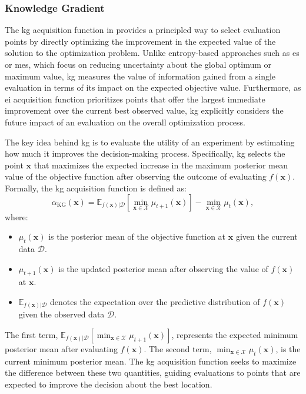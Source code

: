 \subsubsection{Knowledge Gradient}
\label{section:knowledge_gradient}

The \acf{kg} acquisition function in \citet{frazier2008knowledge, wu2016parallel} provides a principled way to select evaluation points by directly optimizing the improvement in the expected value of the solution to the optimization problem. Unlike entropy-based approaches such as \ac{es} or \ac{mes}, which focus on reducing uncertainty about the global optimum or maximum value, \ac{kg} measures the value of information gained from a single evaluation in terms of its impact on the expected objective value. Furthermore, as \acf{ei} acquisition function prioritizes points that offer the largest immediate improvement over the current best observed value, \ac{kg} explicitly considers the future impact of an evaluation on the overall optimization process. 

The key idea behind \ac{kg} is to evaluate the utility of an experiment by estimating how much it improves the decision-making process. Specifically, \ac{kg} selects the point $\mathbf{x}$ that maximizes the expected increase in the maximum posterior mean value of the objective function after observing the outcome of evaluating $f(\mathbf{x})$. Formally, the \ac{kg} acquisition function is defined as:
\begin{equation*}
    \alpha_{\text{KG}}(\mathbf{x}) = \mathbb{E}_{f(\mathbf{x}) \vert \mathcal{D}} \left[ \min_{\mathbf{x} \in \mathcal{X}} \mu_{t+1}(\mathbf{x}) \right] - \min_{\mathbf{x} \in \mathcal{X}} \mu_t(\mathbf{x}),
\end{equation*}
where:
\begin{itemize}
    \item $\mu_t(\mathbf{x})$ is the posterior mean of the objective function at $\mathbf{x}$ given the current data $\mathcal{D}$.
    \item $\mu_{t+1}(\mathbf{x})$ is the updated posterior mean after observing the value of $f(\mathbf{x})$ at $\mathbf{x}$.
    \item $\mathbb{E}_{f(\mathbf{x}) \vert \mathcal{D}}$ denotes the expectation over the predictive distribution of $f(\mathbf{x})$ given the observed data $\mathcal{D}$.
\end{itemize}

The first term, $\mathbb{E}_{f(\mathbf{x}) \vert \mathcal{D}} \left[ \min_{\mathbf{x} \in \mathcal{X}} \mu_{t+1}(\mathbf{x}) \right]$, represents the expected minimum posterior mean after evaluating $f(\mathbf{x})$. The second term, $\min_{\mathbf{x} \in \mathcal{X}} \mu_t(\mathbf{x})$, is the current minimum posterior mean. The \ac{kg} acquisition function seeks to maximize the difference between these two quantities, guiding evaluations to points that are expected to improve the decision about the best location.

